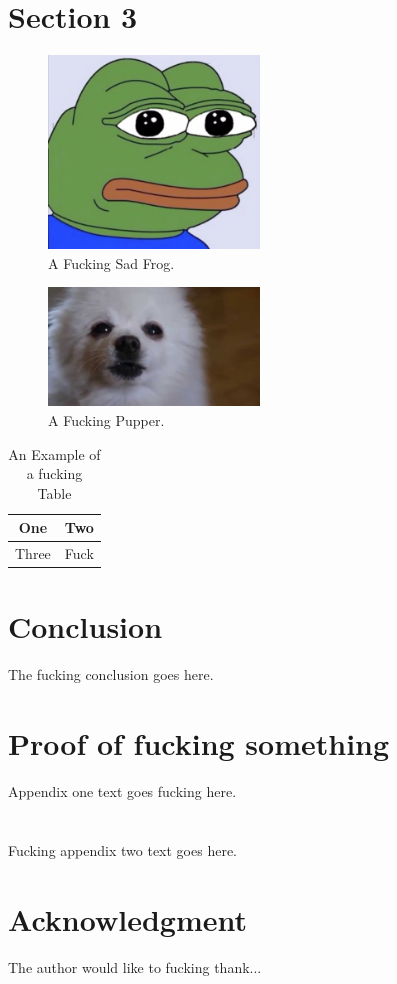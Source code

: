 \documentclass[journal,transmag]{IEEEtran}
\begin{document}
\section{Section 3}
	\lipsum[9-10]
	
\begin{figure}[!t]
	\centering
	\includegraphics[width= 0.5\textwidth]{IMAGES/exampleImage}
	\caption{A Fucking Sad Frog.}
	\label{fig_frog}
\end{figure}

\begin{figure}[!t]
	\centering
	\includegraphics[width= 0.5\textwidth]{IMAGES/fig2}
	\caption{A Fucking Pupper.}
	\label{fig_pup}
\end{figure}

\begin{table}[!t]
	\renewcommand{\arraystretch}{1.3}
	\caption{An Example of a fucking Table}
	\label{table_example}
	\centering
	\begin{tabular}{|c|c|}
		\hline
		One & Two\\
		\hline
		Three & Fuck\\
		\hline
	\end{tabular}
\end{table}

\section{Conclusion}
The fucking conclusion goes here.

\newpage

\appendices
\section{Proof of fucking something}
	Appendix one text goes fucking here.

\section{}
	Fucking appendix two text goes here.

\section*{Acknowledgment}
	The author would like to fucking thank...




\end{document}
